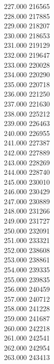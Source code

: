 { 227.000	216565 \\
 228.000	217885 \\
 229.000	218207 \\
 230.000	218653 \\
 231.000	219129 \\
 232.000	219647 \\
 233.000	220028 \\
 234.000	220290 \\
 235.000	220718 \\
 236.000	221250 \\
 237.000	221630 \\
 238.000	225212 \\
 239.000	226463 \\
 240.000	226955 \\
 241.000	227387 \\
 242.000	227889 \\
 243.000	228269 \\
 244.000	228740 \\
 245.000	230010 \\
 246.000	230429 \\
 247.000	230889 \\
 248.000	231266 \\
 249.000	231727 \\
 250.000	232091 \\
 251.000	233321 \\
 252.000	238608 \\
 253.000	238861 \\
 254.000	239335 \\
 255.000	239835 \\
 256.000	240459 \\
 257.000	240712 \\
 258.000	241228 \\
 259.000	241687 \\
 260.000	242218 \\
 261.000	242541 \\
 262.000	242954 \\
 263.000	243413 \\
}
